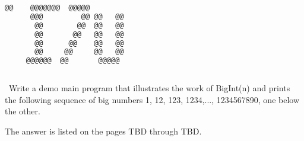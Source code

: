 \documentclass{article}
\begin{document}
	\ttfamily
	\begin{lstlisting}[language=bash]		
	   @@ 	 @@@@@@@  @@@@@  
	  @@@  	      @@ @@   @@ 
	   @@  	     @@  @@   @@ 
	   @@  	    @@   @@   @@ 
	   @@  	   @@    @@   @@ 
	   @@  	  @@     @@   @@ 
	 @@@@@@	 @@       @@@@@  
		 
	\end{lstlisting}
	
	\rmfamily\
	Write a demo main program that illustrates the work of BigInt(n) and prints the following sequence of big numbers 1, 12, 123, 1234,..., 1234567890, one below the other.
	\newline
	
	The answer is listed on the pages TBD through TBD.
	
	
\paragraph{}\
\paragraph{}\
\paragraph{}\
\paragraph{}\
\paragraph{}\
\paragraph{}\
\paragraph{}\
\paragraph{}\
\paragraph{}\
\paragraph{}\
\paragraph{}\
\end{document}
